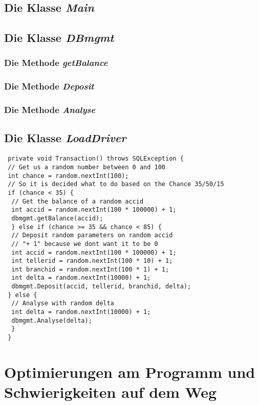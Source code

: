\documentclass[a4paper, bibliography=totoc, 12pt]{scrartcl}
\begin{document}
	\subsection{Die Klasse \emph{Main}}

	\subsection{Die Klasse \emph{DBmgmt}}

		\subsubsection{Die Methode \emph{getBalance}}
	
		\subsubsection{Die Methode \emph{Deposit}}
		
		\subsubsection{Die Methode \emph{Analyse}}

	\subsection{Die Klasse \emph{LoadDriver}}
	
	\begin{lstlisting}
 private void Transaction() throws SQLException {
 // Get us a random number between 0 and 100
 int chance = random.nextInt(100);
 // So it is decided what to do based on the Chance 35/50/15
 if (chance < 35) {
  // Get the balance of a random accid
  int accid = random.nextInt(100 * 100000) + 1;
  dbmgmt.getBalance(accid);
  } else if (chance >= 35 && chance < 85) {
  // Deposit random parameters on random accid
  // "+ 1" because we dont want it to be 0
  int accid = random.nextInt(100 * 100000) + 1;
  int tellerid = random.nextInt(100 * 10) + 1;
  int branchid = random.nextInt(100 * 1) + 1;
  int delta = random.nextInt(10000) + 1;
  dbmgmt.Deposit(accid, tellerid, branchid, delta);
 } else {
  // Analyse with random delta
  int delta = random.nextInt(10000) + 1;
  dbmgmt.Analyse(delta);
  }		
 }
	\end{lstlisting}


\section{Optimierungen am Programm und Schwierigkeiten auf dem Weg}
\end{document}
